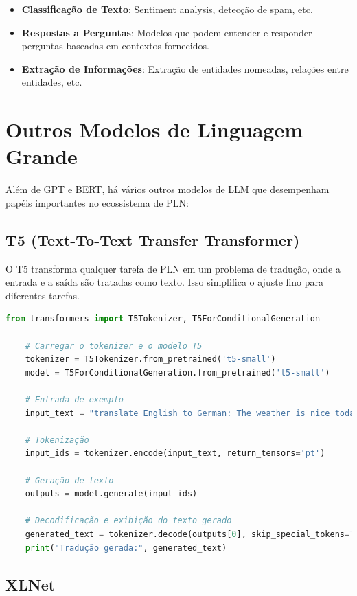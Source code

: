 \documentclass[14pt,a4paper,oneside]{book}
\begin{document}
\begin{itemize}
	\item \textbf{Classificação de Texto}: Sentiment analysis, detecção de spam, etc.
	\item \textbf{Respostas a Perguntas}: Modelos que podem entender e responder perguntas baseadas em contextos fornecidos.
	\item \textbf{Extração de Informações}: Extração de entidades nomeadas, relações entre entidades, etc.
\end{itemize}

\section{Outros Modelos de Linguagem Grande}

Além de GPT e BERT, há vários outros modelos de LLM que desempenham papéis importantes no ecossistema de PLN:

\subsection{T5 (Text-To-Text Transfer Transformer)}

O T5 transforma qualquer tarefa de PLN em um problema de tradução, onde a entrada e a saída são tratadas como texto. Isso simplifica o ajuste fino para diferentes tarefas.

\begin{lstlisting}[language=Python]
	from transformers import T5Tokenizer, T5ForConditionalGeneration
	
	# Carregar o tokenizer e o modelo T5
	tokenizer = T5Tokenizer.from_pretrained('t5-small')
	model = T5ForConditionalGeneration.from_pretrained('t5-small')
	
	# Entrada de exemplo
	input_text = "translate English to German: The weather is nice today."
	
	# Tokenização
	input_ids = tokenizer.encode(input_text, return_tensors='pt')
	
	# Geração de texto
	outputs = model.generate(input_ids)
	
	# Decodificação e exibição do texto gerado
	generated_text = tokenizer.decode(outputs[0], skip_special_tokens=True)
	print("Tradução gerada:", generated_text)
\end{lstlisting}

\subsection{XLNet}
\end{document}
